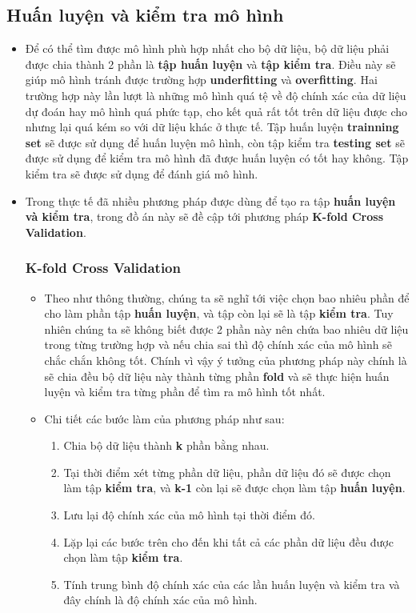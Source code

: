\documentclass{report}
\begin{document}
\subsection{Huấn luyện và kiểm tra mô hình}
    \begin{itemize}
        \item Để có thể tìm được mô hình phù hợp nhất cho bộ dữ liệu, bộ dữ liệu phải được chia thành 2 phần là \textbf{tập huấn luyện} và \textbf{tập kiểm tra}. Điều này sẽ giúp mô hình tránh được trường hợp \textbf{underfitting} và \textbf{overfitting}. Hai trường hợp này lần lượt là những mô hình quá tệ về độ chính xác của dữ liệu dự đoán hay mô hình quá phức tạp, cho kết quả rất tốt trên dữ liệu được cho nhưng lại quá kém so với dữ liệu khác ở thực tế. Tập huấn luyện \textbf{trainning set} sẽ được sử dụng để huấn luyện mô hình, còn tập kiểm tra \textbf{testing set} sẽ được sử dụng để kiểm tra mô hình đã được huấn luyện có tốt hay không. Tập kiểm tra sẽ được sử dụng để đánh giá mô hình.
    
        \item Trong thực tế đã nhiều phương pháp được dùng để  tạo ra tập \textbf{huấn luyện và kiểm tra}, trong đồ án này sẽ đề cập tới phương pháp \textbf{K-fold Cross Validation}.
        
        \subsubsection*{K-fold Cross Validation}\label{sec:k-fold-cross-validation}
            \begin{itemize}
                \item Theo như thông thường, chúng ta sẽ nghĩ tới việc chọn bao nhiêu phần để cho làm phần tập \textbf{huấn luyện}, và tập còn lại sẽ là tập \textbf{kiểm tra}. Tuy nhiên chúng ta sẽ không biết được 2 phần này nên chứa bao nhiêu dữ liệu trong từng trường hợp và nếu chia sai thì độ chính xác của mô hình sẽ chắc chắn không tốt. Chính vì vậy ý tưởng của phương pháp này chính là sẽ chia đều bộ dữ liệu này thành từng phần \textbf{fold} và sẽ thực hiện huấn luyện và kiểm tra từng phần để  tìm ra mô hình tốt nhất.
                \item Chi tiết các bước làm của phương pháp như sau: 
                    \begin{enumerate}
                        \item Chia bộ dữ liệu thành \textbf{k} phần bằng nhau.
                        \item Tại thời điểm xét từng phần dữ liệu, phần dữ liệu đó sẽ được chọn làm tập \textbf{kiểm tra}, và \textbf{k-1} còn lại sẽ được chọn làm tập \textbf{huấn luyện}.
                        \item Lưu lại độ chính xác của mô hình tại thời điểm đó.
                        \item Lặp lại các bước trên cho đến khi tất cả các phần dữ liệu đều được chọn làm tập \textbf{kiểm tra}.
                        \item Tính trung bình độ chính xác của các lần huấn luyện và kiểm tra và đây chính là độ chính xác của mô hình.
                    \end{enumerate}
                

\end{itemize}
\end{itemize}
\end{document}
